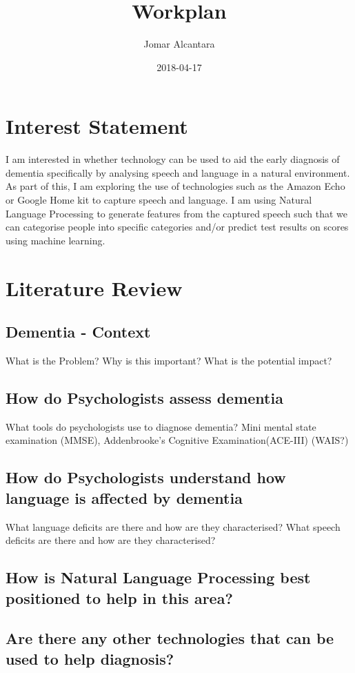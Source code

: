 \documentclass{article}
\title{Workplan}
\date{2018-04-17}
\author{Jomar Alcantara}
\begin{document}
	\maketitle
	\section{Interest Statement}
	I am interested in whether technology can be used to aid the early diagnosis of dementia specifically by analysing speech and language in a natural environment. As part of this, I am exploring the use of technologies such as the Amazon Echo or Google Home kit to capture speech and language. I am using Natural Language Processing to generate features from the captured speech such that we can categorise people into specific categories and/or predict test results on scores using machine learning.
	\section{Literature Review}
	\subsection{Dementia - Context}
	What is the Problem? 
	Why is this important?
	What is the potential impact?
	\subsection{How do Psychologists assess dementia}
	What tools do psychologists use to diagnose dementia? 
	Mini mental state examination (MMSE), 
	Addenbrooke's Cognitive Examination(ACE-III)
	(WAIS?)
	\subsection{How do Psychologists understand how language is affected by dementia}
	What language deficits are there and how are they characterised?
	What speech deficits are there and how are they characterised?
	\subsection{How is Natural Language Processing best positioned to help in this area?}
	\subsection{Are there any other technologies that can be used to help diagnosis?}
	
\end{document}
